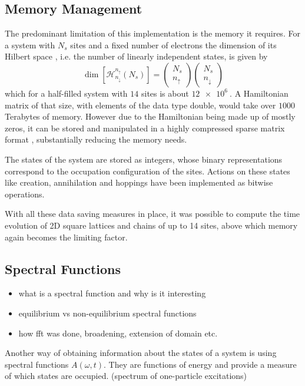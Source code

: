 \subsection{Memory Management}
The predominant limitation of this implementation is the memory it requires. For a system with $N_s$ sites and a fixed number of electrons the dimension of its Hilbert space , i.e. the number of linearly independent states, is given by 
\begin{equation}
    \dim \left[\mathcal{H}^{n_\uparrow}_{n_\downarrow} (N_s)\right] = \begin{pmatrix}N_s \\ n_\uparrow\end{pmatrix} \begin{pmatrix}N_s \\ n_\downarrow\end{pmatrix}
\end{equation}
which for a half-filled system with $14$ sites is about $\SI{12e6}{}$. A Hamiltonian matrix of that size, with elements of the data type double, would take over $1000$ Terabytes of memory. However due to the Hamiltonian being made up of mostly zeros, it can be stored and manipulated in a highly compressed sparse matrix format \cite{innerberger}, substantially reducing the memory needs.
\medskip

The states of the system are stored as integers, whose binary representations correspond to the occupation configuration of the sites. Actions on these states like creation, annihilation and hoppings have been implemented as bitwise operations.
\medskip
 
With all these data saving measures in place, it was possible to compute the time evolution of 2D square lattices and chains of up to 14 sites, above which memory again becomes the limiting factor.



\subsection{Spectral Functions}
\begin{itemize}
    \item what is a spectral function and why is it interesting
    \item equilibrium vs non-equilibrium spectral functions
    \item how fft was done, broadening, extension of domain etc.
\end{itemize}
Another way of obtaining information about the states of a system is using spectral functions $A(\omega, t)$. They are functions of energy and provide a measure of which states are occupied.
(spectrum of one-particle excitations)

